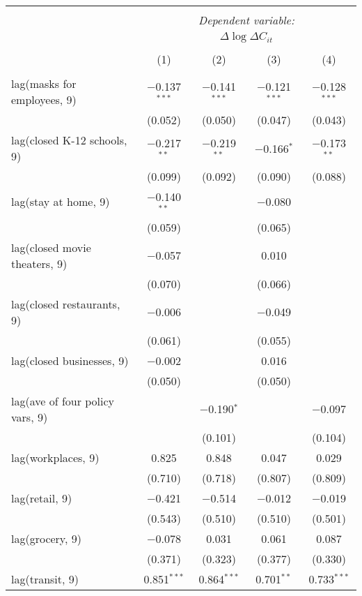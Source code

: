 \begin{tabular}{@{\extracolsep{1pt}}lcccc} 
\\[-1.8ex]\hline 
\hline \\[-1.8ex] 
 & \multicolumn{4}{c}{\textit{Dependent variable:}} \\ 
\cline{2-5} 
 & \multicolumn{4}{c}{$\Delta \log \Delta C_{it}$} \\ 
\\[-1.8ex] & (1) & (2) & (3) & (4)\\ 
\hline \\[-1.8ex] 
 lag(masks for employees, 9) & $-$0.137$^{***}$ & $-$0.141$^{***}$ & $-$0.121$^{***}$ & $-$0.128$^{***}$ \\ 
  & (0.052) & (0.050) & (0.047) & (0.043) \\ 
  lag(closed K-12 schools, 9) & $-$0.217$^{**}$ & $-$0.219$^{**}$ & $-$0.166$^{*}$ & $-$0.173$^{**}$ \\ 
  & (0.099) & (0.092) & (0.090) & (0.088) \\ 
  lag(stay at home, 9) & $-$0.140$^{**}$ &  & $-$0.080 &  \\ 
  & (0.059) &  & (0.065) &  \\ 
  lag(closed movie theaters, 9) & $-$0.057 &  & 0.010 &  \\ 
  & (0.070) &  & (0.066) &  \\ 
  lag(closed restaurants, 9) & $-$0.006 &  & $-$0.049 &  \\ 
  & (0.061) &  & (0.055) &  \\ 
  lag(closed businesses, 9) & $-$0.002 &  & 0.016 &  \\ 
  & (0.050) &  & (0.050) &  \\ 
  lag(ave of four policy vars, 9) &  & $-$0.190$^{*}$ &  & $-$0.097 \\ 
  &  & (0.101) &  & (0.104) \\ 
  lag(workplaces, 9) & 0.825 & 0.848 & 0.047 & 0.029 \\ 
  & (0.710) & (0.718) & (0.807) & (0.809) \\ 
  lag(retail, 9) & $-$0.421 & $-$0.514 & $-$0.012 & $-$0.019 \\ 
  & (0.543) & (0.510) & (0.510) & (0.501) \\ 
  lag(grocery, 9) & $-$0.078 & 0.031 & 0.061 & 0.087 \\ 
  & (0.371) & (0.323) & (0.377) & (0.330) \\ 
  lag(transit, 9) & 0.851$^{***}$ & 0.864$^{***}$ & 0.701$^{**}$ & 0.733$^{***}$ \\ 

\end{tabular}
